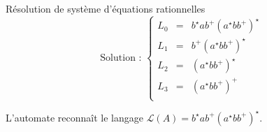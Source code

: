 \begin{frame}{Résolution de système d'équations rationnelles}
  $$
  \text{Solution : }
  \left\{
  \begin{array}{rclclcl}
    L_0 &=& b^\star a b^+ (a^\star bb^+)^\star\\
    L_1 &=& b^+ (a^\star bb^+)^\star \\
    L_2 &=& (a^\star bb^+)^\star \\
    L_3 &=& (a^\star bb^+)^+\\
  \end{array}
  \right.
  $$

  \alert{L'automate reconnaît le langage $\mathcal{L}(A) = b^\star a b^+ (a^\star bb^+)^\star$.}
\end{frame}
\endgroup
